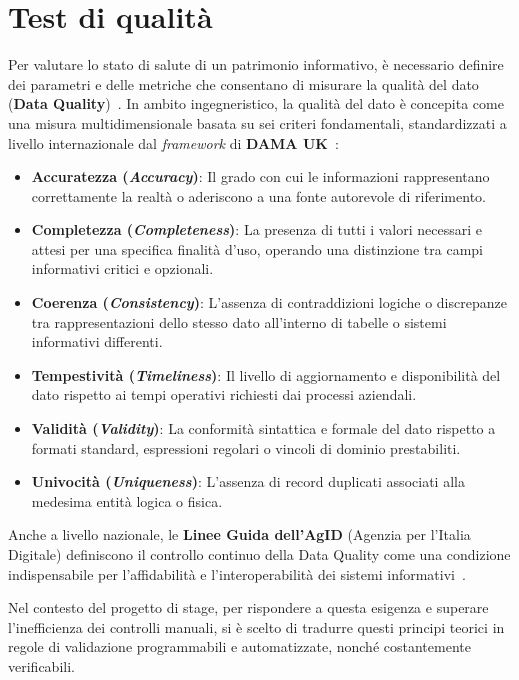 \section{Test di qualità}
Per valutare lo stato di salute di un patrimonio informativo, è necessario definire dei parametri e delle metriche che consentano di misurare la qualità del dato 
(\textbf{Data Quality})~\cite{site:ibm_data_quality}. In ambito ingegneristico, la qualità del dato è concepita come una misura multidimensionale 
basata su sei criteri fondamentali, standardizzati a livello internazionale dal \emph{framework} di \textbf{DAMA UK}~\cite{dama:dq-dimensions}:
\begin{itemize}
    \item \textbf{Accuratezza (\emph{Accuracy})}: Il grado con cui le informazioni rappresentano correttamente la realtà o aderiscono a una fonte autorevole di riferimento.
    \item \textbf{Completezza (\emph{Completeness})}: La presenza di tutti i valori necessari e attesi per una specifica finalità d'uso, operando una distinzione tra campi informativi critici e opzionali.
    \item \textbf{Coerenza (\emph{Consistency})}: L'assenza di contraddizioni logiche o discrepanze tra rappresentazioni dello stesso dato all'interno di tabelle o sistemi informativi differenti.
    \item \textbf{Tempestività (\emph{Timeliness})}: Il livello di aggiornamento e disponibilità del dato rispetto ai tempi operativi richiesti dai processi aziendali.
    \item \textbf{Validità (\emph{Validity})}: La conformità sintattica e formale del dato rispetto a formati standard, espressioni regolari o vincoli di dominio prestabiliti.
    \item \textbf{Univocità (\emph{Uniqueness})}: L'assenza di record duplicati associati alla medesima entità logica o fisica.
\end{itemize}

\noindent Anche a livello nazionale, le \textbf{Linee Guida dell'AgID} (Agenzia per l'Italia Digitale) definiscono il controllo continuo della Data Quality 
come una condizione indispensabile per l'affidabilità e l'interoperabilità dei sistemi informativi~\cite{site:agid-linee-guida}.

Nel contesto del progetto di stage, per rispondere a questa esigenza e superare l'inefficienza dei controlli manuali, si è scelto di tradurre questi principi teorici 
in regole di validazione programmabili e automatizzate, nonché costantemente verificabili.

